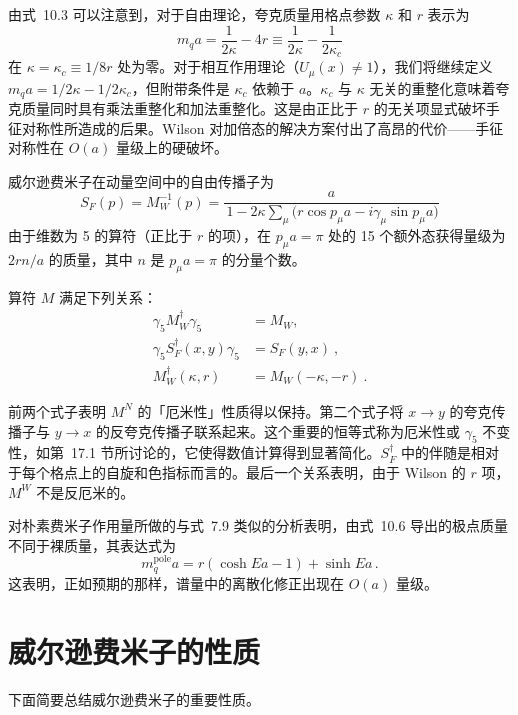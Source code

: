 由式~10.3 可以注意到，对于自由理论，夸克质量用格点参数 $\kappa$ 和 $r$ 表示为
\begin{equation}
m_q a = \frac{1}{2\kappa} - 4r \equiv \frac{1}{2\kappa} - \frac{1}{2\kappa_c}
\end{equation}
在 $\kappa = \kappa_c \equiv 1/8r$ 处为零。对于相互作用理论（$U_\mu(x) \neq 1$），我们将继续定义 $m_q a = 1/2\kappa - 1/2\kappa_c$，但附带条件是 $\kappa_c$ 依赖于 $a$。$\kappa_c$ 与 $\kappa$ 无关的重整化意味着夸克质量同时具有乘法重整化和加法重整化。这是由正比于 $r$ 的无关项显式破坏手征对称性所造成的后果。Wilson 对加倍态的解决方案付出了高昂的代价——手征对称性在 $O(a)$ 量级上的硬破坏。

威尔逊费米子在动量空间中的自由传播子为
\begin{equation}
S_F(p) = M_W^{-1}(p) = \frac{a}{\,1 - 2\kappa \sum_\mu \bigl( r \cos p_\mu a - i\gamma_\mu \sin p_\mu a \bigr)}
\end{equation}
由于维数为 5 的算符（正比于 $r$ 的项），在 $p_\mu a = \pi$ 处的 15 个额外态获得量级为 $2rn/a$ 的质量，其中 $n$ 是 $p_\mu a = \pi$ 的分量个数。

算符 $M$ 满足下列关系：
\begin{align}
\gamma_5 M_W^\dagger \gamma_5 &= M_W, \nonumber\\
\gamma_5 S_F^\dagger (x,y) \gamma_5 &= S_F (y,x) \ , \nonumber\\
M_W^\dagger (\kappa, r) &= M_W (-\kappa, -r) \ .
\end{align}

前两个式子表明 $M^N$ 的「厄米性」性质得以保持。第二个式子将 $x \to y$ 的夸克传播子与 $y \to x$ 的反夸克传播子联系起来。这个重要的恒等式称为厄米性或 $\gamma_5$ 不变性，如第~17.1 节所讨论的，它使得数值计算得到显著简化。$S_F^\dagger$ 中的伴随是相对于每个格点上的自旋和色指标而言的。最后一个关系表明，由于 Wilson 的 $r$ 项，$M^W$ 不是反厄米的。

对朴素费米子作用量所做的与式~7.9 类似的分析表明，由式~10.6 导出的极点质量不同于裸质量，其表达式为
\begin{equation}
m_q^{\mathrm{pole}} a = r(\cosh Ea - 1) + \sinh Ea \,.
\end{equation}
这表明，正如预期的那样，谱量中的离散化修正出现在 $O(a)$ 量级。

\section{威尔逊费米子的性质}

下面简要总结威尔逊费米子的重要性质。

